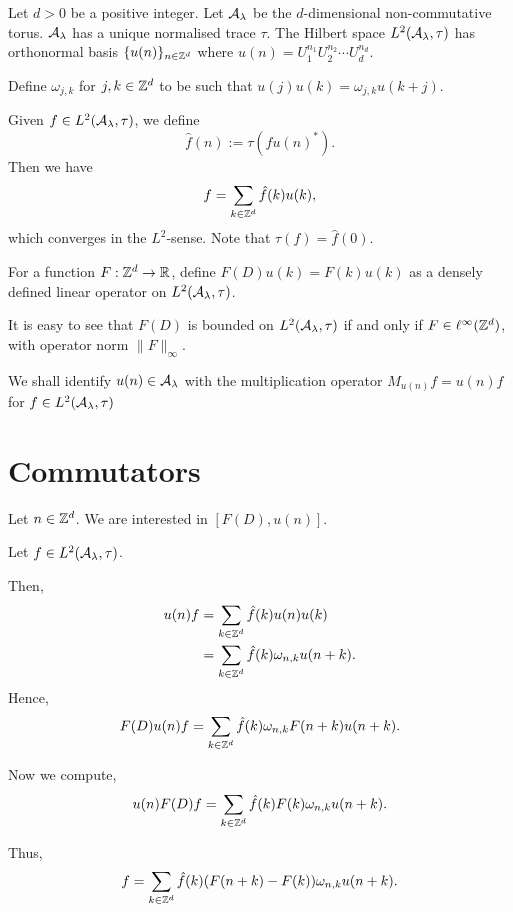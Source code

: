 Let $d > 0$ be a positive integer. 
Let $\mathcal{A}_{\lambda}$ be the $d$-dimensional non-commutative torus.
$\mathcal{A}_\lambda$ has a unique normalised trace $\tau$.
The Hilbert space $L^2(\mathcal{A}_\lambda,\tau)$ 
has orthonormal basis $\{u(n)\}_{n \in \mathbb{Z}^d}$ where $u(n) = U_1^{n_1}U_2^{n_2}\cdots U_d^{n_d}$.

Define $\omega_{j,k}$ for $j,k \in \mathbb{Z}^d$ to be such
that $u(j)u(k) = \omega_{j,k}u(k+j)$.

Given $f \in L^2(\mathcal{A}_\lambda,\tau)$, we define
\begin{equation}
    \hat{f}(n) := \tau(fu(n)^*).
\end{equation}
Then we have
\begin{equation}
    f = \sum_{k \in \mathbb{Z}^d} \hat{f}(k)u(k),
\end{equation}
which converges in the $L^2$-sense. Note that $\tau(f) = \hat{f}(0)$.

For a function $F:\mathbb{Z}^d\rightarrow \mathbb{R}$, define $F(D) u(k) = F(k)u(k)$
as a densely defined linear operator on $L^2(\mathcal{A}_\lambda,\tau)$. 

It is easy to see that $F(D)$ is bounded on $L^2(\mathcal{A}_\lambda,\tau)$
if and only if $F \in \ell^\infty(\mathbb{Z}^d)$, with operator norm
$\|F\|_\infty$.

We shall identify $u(n) \in \mathcal{A}_\lambda$ with the multiplication operator
$M_{u(n)}f = u(n)f$ for $f \in L^2(\mathcal{A}_\lambda,\tau)$

\section{Commutators}
Let $n \in \mathbb{Z}^d$. We are interested in $[F(D),u(n)]$. 

Let $f \in L^2(\mathcal{A}_\lambda,\tau)$. 

Then,
\begin{align}
    u(n)f &= \sum_{k \in \mathbb{Z}^d} \hat{f}(k)u(n)u(k)\\
          &= \sum_{k \in \mathbb{Z}^d} \hat{f}(k)\omega_{n,k} u(n+k).
\end{align}
Hence,
\begin{equation}
    F(D) u(n)f = \sum_{k \in \mathbb{Z}^d} \hat{f}(k) \omega_{n,k} F(n+k) u(n+k).
\end{equation}

Now we compute,
\begin{equation}
    u(n)F(D)f = \sum_{k \in \mathbb{Z}^d} \hat{f}(k) F(k) \omega_{n,k} u(n+k).
\end{equation}

Thus,
\begin{equation}
    [F(D),u(n)]f = \sum_{k \in \Itgr^d} \hat{f}(k) (F(n+k)-F(k))\omega_{n,k}u(n+k).
\end{equation}

